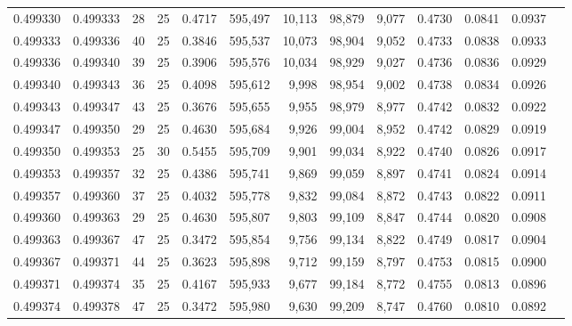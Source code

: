 \begin{tabular}{rrrrrrrrrrrrr}
0.499330 & 0.499333 &    28 &  25 &                                     0.4717 & 595,497 &  10,113 &  98,879 &   9,077 & 0.4730 & 0.0841 & 0.0937 \\
0.499333 & 0.499336 &    40 &  25 &                                     0.3846 & 595,537 &  10,073 &  98,904 &   9,052 & 0.4733 & 0.0838 & 0.0933 \\
0.499336 & 0.499340 &    39 &  25 &                                     0.3906 & 595,576 &  10,034 &  98,929 &   9,027 & 0.4736 & 0.0836 & 0.0929 \\
0.499340 & 0.499343 &    36 &  25 &                                     0.4098 & 595,612 &   9,998 &  98,954 &   9,002 & 0.4738 & 0.0834 & 0.0926 \\
0.499343 & 0.499347 &    43 &  25 &                                     0.3676 & 595,655 &   9,955 &  98,979 &   8,977 & 0.4742 & 0.0832 & 0.0922 \\
0.499347 & 0.499350 &    29 &  25 &                                     0.4630 & 595,684 &   9,926 &  99,004 &   8,952 & 0.4742 & 0.0829 & 0.0919 \\
0.499350 & 0.499353 &    25 &  30 &                                     0.5455 & 595,709 &   9,901 &  99,034 &   8,922 & 0.4740 & 0.0826 & 0.0917 \\
0.499353 & 0.499357 &    32 &  25 &                                     0.4386 & 595,741 &   9,869 &  99,059 &   8,897 & 0.4741 & 0.0824 & 0.0914 \\
0.499357 & 0.499360 &    37 &  25 &                                     0.4032 & 595,778 &   9,832 &  99,084 &   8,872 & 0.4743 & 0.0822 & 0.0911 \\
0.499360 & 0.499363 &    29 &  25 &                                     0.4630 & 595,807 &   9,803 &  99,109 &   8,847 & 0.4744 & 0.0820 & 0.0908 \\
0.499363 & 0.499367 &    47 &  25 &                                     0.3472 & 595,854 &   9,756 &  99,134 &   8,822 & 0.4749 & 0.0817 & 0.0904 \\
0.499367 & 0.499371 &    44 &  25 &                                     0.3623 & 595,898 &   9,712 &  99,159 &   8,797 & 0.4753 & 0.0815 & 0.0900 \\
0.499371 & 0.499374 &    35 &  25 &                                     0.4167 & 595,933 &   9,677 &  99,184 &   8,772 & 0.4755 & 0.0813 & 0.0896 \\
0.499374 & 0.499378 &    47 &  25 &                                     0.3472 & 595,980 &   9,630 &  99,209 &   8,747 & 0.4760 & 0.0810 & 0.0892 \\

\end{tabular}
